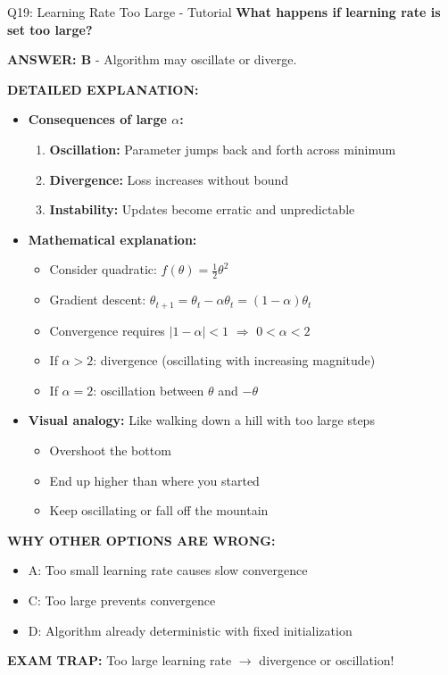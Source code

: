\documentclass[8pt]{beamer}
\begin{document}
	\begin{frame}{Q19: Learning Rate Too Large - Tutorial}
		\fontsize{6.5}{7.5}\selectfont
		\textbf{What happens if learning rate is set too large?}
		
		\vspace{0.05cm}
		\textcolor{myblue}{\textbf{ANSWER: B}} - Algorithm may oscillate or diverge.
		
		\vspace{0.05cm}
		\textbf{DETAILED EXPLANATION:}
		\begin{itemize}
			\item \textbf{Consequences of large $\alpha$:}
			\begin{enumerate}
				\item \textbf{Oscillation:} Parameter jumps back and forth across minimum
				\item \textbf{Divergence:} Loss increases without bound
				\item \textbf{Instability:} Updates become erratic and unpredictable
			\end{enumerate}
			\item \textbf{Mathematical explanation:}
			\begin{itemize}
				\item Consider quadratic: $f(\theta) = \frac{1}{2}\theta^2$
				\item Gradient descent: $\theta_{t+1} = \theta_t - \alpha \theta_t = (1-\alpha)\theta_t$
				\item Convergence requires $|1-\alpha| < 1$ $\Rightarrow$ $0 < \alpha < 2$
				\item If $\alpha > 2$: divergence (oscillating with increasing magnitude)
				\item If $\alpha = 2$: oscillation between $\theta$ and $-\theta$
			\end{itemize}
			\item \textbf{Visual analogy:} Like walking down a hill with too large steps
			\begin{itemize}
				\item Overshoot the bottom
				\item End up higher than where you started
				\item Keep oscillating or fall off the mountain
			\end{itemize}
		\end{itemize}
		
		\vspace{0.05cm}
		\textcolor{myred}{\textbf{WHY OTHER OPTIONS ARE WRONG:}}
		\begin{itemize}
			\item \textcolor{myred}{A:} Too small learning rate causes slow convergence
			\item \textcolor{myred}{C:} Too large prevents convergence
			\item \textcolor{myred}{D:} Algorithm already deterministic with fixed initialization
		\end{itemize}
		
		\textcolor{myred}{\textbf{EXAM TRAP:}} Too large learning rate $\rightarrow$ \textcolor{myred}{divergence or oscillation}!
	\end{frame}
	
\end{document}
